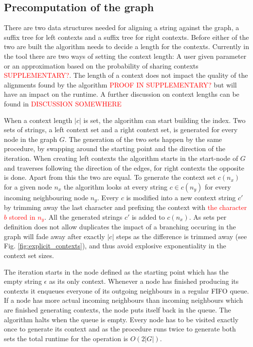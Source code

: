 \documentclass{article}
\begin{document}
\subsection{Precomputation of the graph}
There are two data structures needed for aligning a string against the graph, a suffix tree for left contexts and a suffix tree for right contexts. Before either of the two are built the algorithm needs to decide a length for the contexts. Currently in the tool there are two ways of setting the context length: A user given parameter or an approximation based on the probability of sharing contexts \textcolor{red}{SUPPLEMENTARY?}. The length of a context does not impact the quality of the alignments found by the algorithm \textcolor{red}{PROOF IN SUPPLEMENTARY?} but will have an impact on the runtime. A further discussion on context lengths can be found in \textcolor{red}{DISCUSSION SOMEWHERE}\\
\par\noindent
When a context length $|c|$ is set, the algorithm can start building the index. Two sets of strings, a left context set and a right context set, is generated for every node in the graph $G$. The generation of the two sets happen by the same procedure, by swapping around the starting point and the direction of the iteration. When creating left contexts the algorithm starts in the start-node of $G$ and traverses following the direction of the edges, for right contexts the opposite is done. Apart from this the two are equal. To generate the context set $c(n_x)$ for a given node $n_x$ the algorithm looks at every string $c \in c(n_y)$ for every incoming neighbouring node $n_y$. Every $c$ is modified into a new context string $c'$ by trimming away the last character and prefixing the context with \textcolor{red}{the character $b$ stored in $n_y$}. All the generated strings $c'$ is added to $c(n_x)$. As sets per definition does not allow duplicates the impact of a branching occuring in the graph will fade away after exactly $|c|$ steps as the difference is trimmed away (see Fig. \ref{fig:explicit_contexts}), and thus avoid explosive exponentiality in the context set sizes.\\
\par\noindent
The iteration starts in the node defined as the starting point which has the empty string $\epsilon$ as its only context. Whenever a node has finished producing its contexts it enqueues everyone of its outgoing neighbours in a regular FIFO queue. If a node has more actual incoming neighbours than incoming neighbours which are finished generating contexts, the node puts itself back in the queue. The algorithm halts when the queue is empty. Every node has to be visited exactly once to generate its context and as the procedure runs twice to generate both sets the total runtime for the operation is $O(2|G|)$.\\
\end{document}
